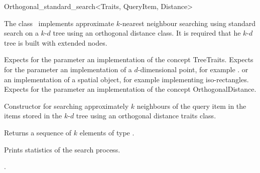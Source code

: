 

\begin{ccRefClass}{Orthogonal_standard_search<Traits, QueryItem, Distance>}  %


\ccDefinition

The class \ccRefName\ implements approximate $k$-nearest neighbour searching
using standard search on a $k$-$d$ tree using an orthogonal distance
class. It is required that he $k$-$d$ tree is built with extended nodes.


\ccParameters

Expects for the parameter  an implementation of the concept TreeTraits.
Expects for the parameter   an implementation
of a $d$-dimensional point, for example .
or an implementation of a spatial object, for
example  implementing iso-rectangles.
Expects for the parameter  an implementation of the
concept OrthogonalDistance.

\ccTypes



\ccCreation
{}  %

{Constructor for searching approximately $k$ neighbours of the query item 
in the items stored in the $k$-$d$ tree  using an orthogonal distance
traits class.}


{Returns a sequence of $k$ elements of type }.

{
Prints statistics of the search process.
}

\ccSeeAlso

.

\end{ccRefClass}



